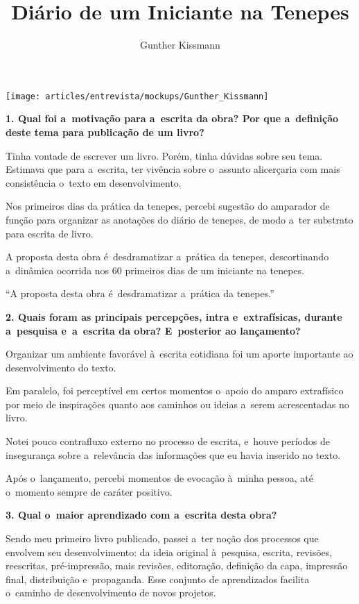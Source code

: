\documentclass{gescons}
\author{Gunther Kissmann}
\title{Diário de um Iniciante na Tenepes}
\begin{document}
    \makeentrevistatitle

    \begin{multicols}{2}

\begin{center}
    \texttt{[image: articles/entrevista/mockups/Gunther\_Kissmann]}
\end{center}


\textbf{1. Qual foi a~motivação para a~escrita da obra? Por que a~definição deste tema para publicação de um livro?}

Tinha vontade de escrever um livro. Porém, tinha dúvidas sobre seu tema. Estimava que para a~escrita, ter vivência sobre o~assunto alicerçaria com mais consistência o~texto em desenvolvimento.

Nos primeiros dias da prática da tenepes, percebi sugestão do amparador de função para organizar as anotações do diário de tenepes, de modo a~ter substrato para escrita de livro.

A proposta desta obra é~desdramatizar a~prática da tenepes, descortinando a~dinâmica ocorrida nos 60 primeiros dias de um iniciante na tenepes.

\begin{pullquote}
``A proposta desta obra é~desdramatizar a~prática da tenepes.''
\end{pullquote}

\textbf{2. Quais foram as principais percepções, intra e~extrafísicas, durante a~pesquisa e~a~escrita da obra? E~posterior ao lançamento?}

Organizar um ambiente favorável à~escrita cotidiana foi um aporte importante ao desenvolvimento do texto.

Em paralelo, foi perceptível em certos momentos o~apoio do amparo extrafísico por meio de inspirações quanto aos caminhos ou ideias a~serem acrescentadas no livro.

Notei pouco contrafluxo externo no processo de escrita, e~houve períodos de insegurança sobre a~relevância das informações que eu havia inserido no texto.

Após o~lançamento, percebi momentos de evocação à~minha pessoa, até o~momento sempre de caráter positivo.

\textbf{3. Qual o~maior aprendizado com a~escrita desta obra?}

Sendo meu primeiro livro publicado, passei a~ter noção dos processos que envolvem seu desenvolvimento: da ideia original à~pesquisa, escrita, revisões, reescritas, pré-impressão, mais revisões, editoração, definição da capa, impressão final, distribuição e~propaganda. Esse conjunto de aprendizados facilita o~caminho de desenvolvimento de novos projetos.


\end{multicols}
\end{document}
